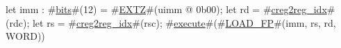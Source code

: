 let imm : #\hyperref[sailRISCVzbits]{bits}#(12) = #\hyperref[sailRISCVzEXTZ]{EXTZ}#(uimm @ 0b00);
let rd = #\hyperref[sailRISCVzcreg2regzyidx]{creg2reg\_idx}#(rdc);
let rs = #\hyperref[sailRISCVzcreg2regzyidx]{creg2reg\_idx}#(rsc);
#\hyperref[sailRISCVzexecute]{execute}#(#\hyperref[sailRISCVzLOADzyFP]{LOAD\_FP}#(imm, rs, rd, WORD))
